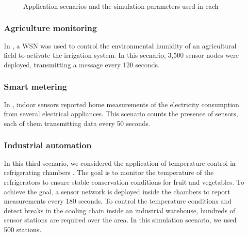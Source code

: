 \documentclass[]{article}
\begin{document}
\setcounter{figure}{1}
\begin{figure}
\begin{center}
\caption{Application scenarios and the simulation parameters used in each} \label{fig:sce_param}
\end{center}
\end{figure}

\subsubsection{Agriculture monitoring}

In \cite{scenario1}, a WSN was used to control the environmental humidity of an agricultural field to activate the irrigation system. In this scenario, 3,500 sensor nodes were deployed, transmitting a message every 120 seconds. 
 
\subsubsection{Smart metering}

In \cite{scenario3}, indoor sensors reported home measurements of the electricity consumption from several electrical appliances. This scenario counts the presence of  sensors, each of them transmitting data every 50 seconds.

\subsubsection{Industrial automation}


In this third scenario, we considered the application of temperature control in refrigerating chambers \cite{scenario2}. The goal is to monitor the temperature of the refrigerators to ensure stable conservation conditions for fruit and vegetables. To achieve the goal, a sensor network is deployed inside the chambers to report measurements every 180 seconds. To control the temperature conditions and detect breaks in the cooling chain inside an industrial warehouse, hundreds of sensor stations are required over the area. In this simulation scenario, we used 500 stations.
\end{document}
